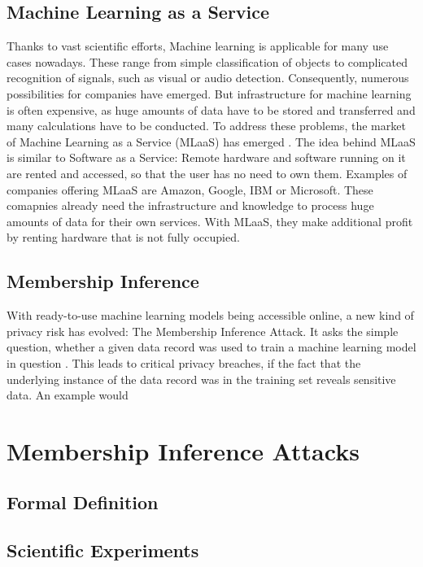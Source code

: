 \documentclass[runningheads]{llncs}
\begin{document}
\subsection{Machine Learning as a Service}

Thanks to vast scientific efforts, Machine learning is applicable for many use cases nowadays. These range from simple classification of objects to complicated recognition of signals, such as visual or audio detection. Consequently, numerous possibilities for companies have emerged. But infrastructure for machine learning is often expensive, as huge amounts of data have to be stored and transferred and many calculations have to be conducted. To address these problems, the market of Machine Learning as a Service (MLaaS) has emerged \cite{ribeiro2015mlaas}. The idea behind MLaaS is similar to Software as a Service: Remote hardware and software running on it are rented and accessed, so that the user has no need to own them. Examples of companies offering MLaaS are Amazon, Google, IBM or Microsoft. These comapnies already need the infrastructure and knowledge to process huge amounts of data for their own services. With MLaaS, they make additional profit by renting hardware that is not fully occupied.

\subsection{Membership Inference}

With ready-to-use machine learning models being accessible online, a new kind of privacy risk has evolved: The Membership Inference Attack. It asks the simple question, whether a given data record was used to train a machine learning model in question \cite{shokri2017membership}. This leads to critical privacy breaches, if the fact that the underlying instance of the data record was in the training set reveals sensitive data. An example would 


\section{Membership Inference Attacks}
\subsection{Formal Definition}
\subsection{Scientific Experiments}
\end{document}
